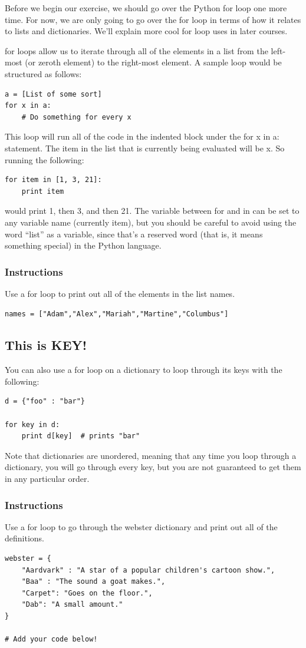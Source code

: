 \documentclass[12pt,a4paper,final,twoside,onecolumn,titlepage]{book}
\begin{document}
Before we begin our exercise, we should go over the Python for loop one more time. For now, we are only going to go over the for loop in terms of how it relates to lists and dictionaries. We'll explain more cool for loop uses in later courses.

for loops allow us to iterate through all of the elements in a list from the left-most (or zeroth element) to the right-most element. A sample loop would be structured as follows:

\begin{lstlisting}
a = [List of some sort]
for x in a: 
    # Do something for every x
\end{lstlisting}
This loop will run all of the code in the indented block under the for x in a: statement. The item in the list that is currently being evaluated will be x. So running the following:
\begin{lstlisting}
for item in [1, 3, 21]: 
    print item
\end{lstlisting}
would print 1, then 3, and then 21. The variable between for and in can be set to any variable name (currently item), but you should be careful to avoid using the word “list” as a variable, since that's a reserved word (that is, it means something special) in the Python language.
\subsubsection{Instructions}
Use a for loop to print out all of the elements in the list names.
\begin{lstlisting}
names = ["Adam","Alex","Mariah","Martine","Columbus"]
\end{lstlisting}

\subsection{This is KEY!}

You can also use a for loop on a dictionary to loop through its keys with the following:
\begin{lstlisting}
d = {"foo" : "bar"}

for key in d: 
    print d[key]  # prints "bar" 
\end{lstlisting}
Note that dictionaries are unordered, meaning that any time you loop through a dictionary, you will go through every key, but you are not guaranteed to get them in any particular order.
\subsubsection{Instructions}
Use a for loop to go through the webster dictionary and print out all of the definitions.
\begin{lstlisting}
webster = {
	"Aardvark" : "A star of a popular children's cartoon show.",
    "Baa" : "The sound a goat makes.",
    "Carpet": "Goes on the floor.",
    "Dab": "A small amount."
}

# Add your code below!
\end{lstlisting}
\end{document}

